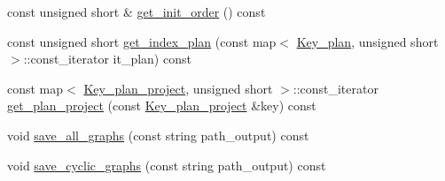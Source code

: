 \begin{CompactItemize}
\item 
const unsigned short \& \hyperlink{classgenevalmag_1_1Builder__plans_52157d41e3998900e61ab90eda9e4e91}{get\_\-init\_\-order} () const 
\item 
const unsigned short \hyperlink{classgenevalmag_1_1Builder__plans_7748b68109c6c6aa805bbd1886dd6029}{get\_\-index\_\-plan} (const map$<$ \hyperlink{structgenevalmag_1_1k__plan}{Key\_\-plan}, unsigned short $>$::const\_\-iterator it\_\-plan) const 
\item 
const map$<$ \hyperlink{structgenevalmag_1_1k__p__project}{Key\_\-plan\_\-project}, unsigned short $>$::const\_\-iterator \hyperlink{classgenevalmag_1_1Builder__plans_2aecc3840ac5d583959073e5d7657b34}{get\_\-plan\_\-project} (const \hyperlink{structgenevalmag_1_1k__p__project}{Key\_\-plan\_\-project} \&key) const 
\item 
void \hyperlink{classgenevalmag_1_1Builder__plans_3b70a30427aa135641a75d0d42e23500}{save\_\-all\_\-graphs} (const string path\_\-output) const 
\item 
void \hyperlink{classgenevalmag_1_1Builder__plans_c9502627f9433c4cab7d03678e507a66}{save\_\-cyclic\_\-graphs} (const string path\_\-output) const 
\end{CompactItemize}
